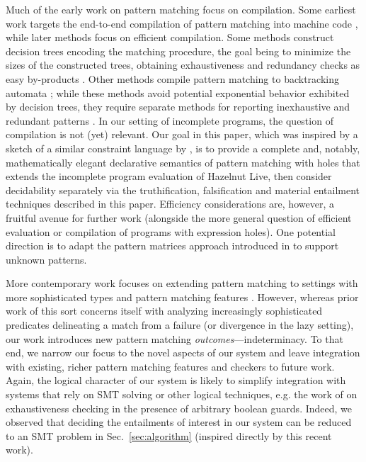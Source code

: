 Much of the early work on pattern matching focus on compilation. Some earliest work targets the end-to-end compilation of pattern matching into machine code \cite{DBLP:conf/lfp/Cardelli84,DBLP:conf/lfp/Augustsson84,DBLP:conf/fpca/Augustsson85}, while later methods focus on efficient compilation. Some methods construct decision trees encoding the matching procedure, the goal being to minimize the sizes of the constructed trees, obtaining exhaustiveness and redundancy checks as easy by-products \cite{Aitken92smlnj,Baudinet85treepattern,Sestoft96mlpattern}.
Other methods compile pattern matching to backtracking automata \cite{Maranget94lazybacktracking,DBLP:journals/jfp/Maranget07};
while these methods avoid potential exponential behavior exhibited by decision trees, they require separate methods for reporting inexhaustive and redundant patterns \cite{DBLP:journals/jfp/Maranget07}.
In our setting of incomplete programs, the question of compilation is not (yet) relevant. Our goal in this paper, which was inspired by a sketch of a similar constraint language by \citet{Harper2012}, is to provide a complete and, notably, mathematically elegant declarative semantics of pattern matching with holes that extends the incomplete program evaluation of Hazelnut Live, then consider decidability separately via the truthification, falsification and material entailment techniques described in this paper.  
Efficiency considerations are, however, a fruitful avenue for further work (alongside the more general question of efficient evaluation or compilation of programs with expression holes). One potential direction is to adapt the pattern matrices approach introduced in \cite{DBLP:journals/jfp/Maranget07} to support unknown patterns.

More contemporary work focuses on extending pattern matching to settings with more sophisticated types and pattern matching features \cite{DBLP:conf/icfp/VazouSJVJ14,DBLP:journals/pacmpl/CockxA18,DBLP:conf/itp/Sozeau10,DBLP:conf/icfp/KarachaliasSVJ15,DBLP:journals/pacmpl/GrafJS20,DBLP:journals/jfp/ConventLMM20}.
However, whereas prior work of this sort concerns itself with analyzing increasingly sophisticated predicates delineating a match from a failure (or divergence in the lazy setting), our work introduces new pattern matching \emph{outcomes}---indeterminacy.
To that end, we narrow our focus to the novel aspects of our system and leave integration with existing, richer pattern matching features and checkers to future work. Again, the logical character of our system is likely to simplify integration with systems that rely on SMT solving or other logical techniques, e.g. the work of \citet{DBLP:journals/pacmpl/GrafJS20} on exhaustiveness checking in the presence of arbitrary boolean guards. Indeed, we observed that deciding the entailments of interest in our system can be reduced to an SMT problem in Sec.~\ref{sec:algorithm} (inspired directly by this recent work).

